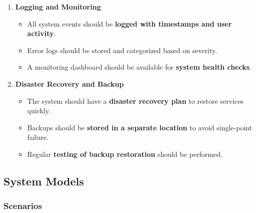 \documentclass[11pt]{article}
\begin{document}
\begin{enumerate}
    \item \textbf{Logging and Monitoring}
    \begin{itemize}
        \item All system events should be \textbf{logged with timestamps and user activity}.
        \item Error logs should be stored and categorized based on severity.
        \item A monitoring dashboard should be available for \textbf{system health checks}.
    \end{itemize}

    \item \textbf{Disaster Recovery and Backup}
    \begin{itemize}
        \item The system should have a \textbf{disaster recovery plan} to restore services quickly.
        \item Backups should be \textbf{stored in a separate location} to avoid single-point failure.
        \item Regular \textbf{testing of backup restoration} should be performed.
    \end{itemize}
\end{enumerate}
\subsection{System Models}
\subsubsection{Scenarios}
\end{document}
